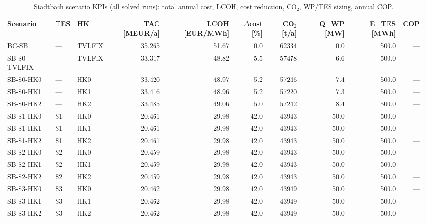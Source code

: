 \begin{table}[htbp]
  \centering
  \caption{Stadtbach scenario KPIs (all solved runs): total annual cost, LCOH, cost reduction, CO₂, WP/TES sizing, annual COP.}
  \label{tab:tab_T3_stadtbach_kpis}
  \begin{tabular}{ll lrrrrrrr}
  \toprule
  Scenario & TES & HK & TAC [MEUR/a] & LCOH [EUR/MWh] & $\Delta$cost [\%] & CO$_2$ [t/a] & Q\_WP [MW] & E\_TES [MWh] & COP \\
  \midrule
  BC-SB & — & TVLFIX & 35.265 & 51.67 & 0.0 & 62334 & 0.0 & 500.0 & — \\
  SB-S0-TVLFIX & — & TVLFIX & 33.317 & 48.82 & 5.5 & 57478 & 6.6 & 500.0 & — \\
  SB-S0-HK0 & — & HK0 & 33.420 & 48.97 & 5.2 & 57246 & 7.4 & 500.0 & — \\
  SB-S0-HK1 & — & HK1 & 33.416 & 48.96 & 5.2 & 57220 & 7.3 & 500.0 & — \\
  SB-S0-HK2 & — & HK2 & 33.485 & 49.06 & 5.0 & 57242 & 8.4 & 500.0 & — \\
  SB-S1-HK0 & S1 & HK0 & 20.461 & 29.98 & 42.0 & 43943 & 50.0 & 500.0 & — \\
  SB-S1-HK1 & S1 & HK1 & 20.461 & 29.98 & 42.0 & 43943 & 50.0 & 500.0 & — \\
  SB-S1-HK2 & S1 & HK2 & 20.461 & 29.98 & 42.0 & 43943 & 50.0 & 500.0 & — \\
  SB-S2-HK0 & S2 & HK0 & 20.459 & 29.98 & 42.0 & 43943 & 50.0 & 500.0 & — \\
  SB-S2-HK1 & S2 & HK1 & 20.459 & 29.98 & 42.0 & 43943 & 50.0 & 500.0 & — \\
  SB-S2-HK2 & S2 & HK2 & 20.459 & 29.98 & 42.0 & 43943 & 50.0 & 500.0 & — \\
  SB-S3-HK0 & S3 & HK0 & 20.462 & 29.98 & 42.0 & 43949 & 50.0 & 500.0 & — \\
  SB-S3-HK1 & S3 & HK1 & 20.462 & 29.98 & 42.0 & 43949 & 50.0 & 500.0 & — \\
  SB-S3-HK2 & S3 & HK2 & 20.462 & 29.98 & 42.0 & 43949 & 50.0 & 500.0 & — \\
  \bottomrule
  \end{tabular}
\end{table}
